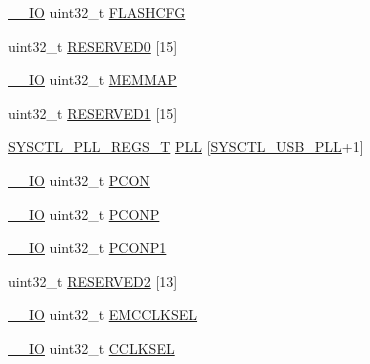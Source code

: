 \begin{DoxyCompactItemize}
\item 
\hyperlink{core__cm3_8h_aec43007d9998a0a0e01faede4133d6be}{\-\_\-\-\_\-\-I\-O} uint32\-\_\-t \hyperlink{structLPC__SYSCTL__T_a8dcbc2e1c89d7bd42dbd19f66e2ddd8e}{F\-L\-A\-S\-H\-C\-F\-G}
\item 
uint32\-\_\-t \hyperlink{structLPC__SYSCTL__T_aba8b07e1d5fe15516928f19d739f700e}{R\-E\-S\-E\-R\-V\-E\-D0} \mbox{[}15\mbox{]}
\item 
\hyperlink{core__cm3_8h_aec43007d9998a0a0e01faede4133d6be}{\-\_\-\-\_\-\-I\-O} uint32\-\_\-t \hyperlink{structLPC__SYSCTL__T_a5a5d2dc160a256a110878af0c2757a64}{M\-E\-M\-M\-A\-P}
\item 
uint32\-\_\-t \hyperlink{structLPC__SYSCTL__T_a794708954b13d73772d88570372b7e31}{R\-E\-S\-E\-R\-V\-E\-D1} \mbox{[}15\mbox{]}
\item 
\hyperlink{structSYSCTL__PLL__REGS__T}{S\-Y\-S\-C\-T\-L\-\_\-\-P\-L\-L\-\_\-\-R\-E\-G\-S\-\_\-\-T} \hyperlink{structLPC__SYSCTL__T_aabc2ad04761cf7c1cbfa8a43ddc91c84}{P\-L\-L} \mbox{[}\hyperlink{group__SYSCTL__17XX__40XX_gga5f5478a201b021ed04a0724bff524c4ba5ee38509163556b883664d7259c43dfd}{S\-Y\-S\-C\-T\-L\-\_\-\-U\-S\-B\-\_\-\-P\-L\-L}+1\mbox{]}
\item 
\hyperlink{core__cm3_8h_aec43007d9998a0a0e01faede4133d6be}{\-\_\-\-\_\-\-I\-O} uint32\-\_\-t \hyperlink{structLPC__SYSCTL__T_a92e2ea242fb2d75af44c1979a8cf9ce4}{P\-C\-O\-N}
\item 
\hyperlink{core__cm3_8h_aec43007d9998a0a0e01faede4133d6be}{\-\_\-\-\_\-\-I\-O} uint32\-\_\-t \hyperlink{structLPC__SYSCTL__T_a27650e24e19bd3b8db140db39d9ab1c4}{P\-C\-O\-N\-P}
\item 
\hyperlink{core__cm3_8h_aec43007d9998a0a0e01faede4133d6be}{\-\_\-\-\_\-\-I\-O} uint32\-\_\-t \hyperlink{structLPC__SYSCTL__T_a7e1241849ab9c934991342896ba7c296}{P\-C\-O\-N\-P1}
\item 
uint32\-\_\-t \hyperlink{structLPC__SYSCTL__T_a2832f1458683513b2c4c017670c2193c}{R\-E\-S\-E\-R\-V\-E\-D2} \mbox{[}13\mbox{]}
\item 
\hyperlink{core__cm3_8h_aec43007d9998a0a0e01faede4133d6be}{\-\_\-\-\_\-\-I\-O} uint32\-\_\-t \hyperlink{structLPC__SYSCTL__T_a23152315a7ac650737bf1b3852bab194}{E\-M\-C\-C\-L\-K\-S\-E\-L}
\item 
\hyperlink{core__cm3_8h_aec43007d9998a0a0e01faede4133d6be}{\-\_\-\-\_\-\-I\-O} uint32\-\_\-t \hyperlink{structLPC__SYSCTL__T_a5cebc138aa8f8591199efafea7bc316f}{C\-C\-L\-K\-S\-E\-L}
\item 

\end{DoxyCompactItemize}
